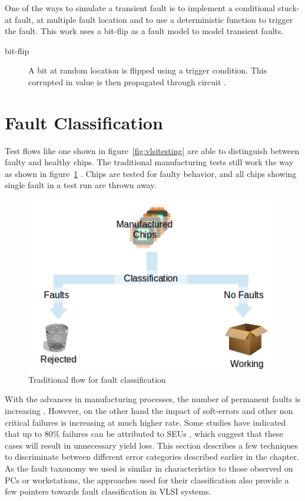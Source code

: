 One of the ways  to simulate a transient fault is to implement a conditional stuck-at fault, at multiple fault location and to use a deterministic function to trigger the fault. This work uses a bit-flip as a fault model to model transient faults.

\begin{description}
	\item[bit-flip] A bit at random location is flipped using a trigger condition. This corrupted in value is then propagated through circuit \cite{Gracia2001}. 
\end{description}

\section{Fault Classification}
\label{sec:secfc}
Test flows like one shown in figure~\ref{fig:vlsitesting} are able to distinguish between faulty and healthy chips. The traditional manufacturing tests still work the way as shown in figure~\ref{fig:traditionaltestflow} \cite{Weste1985}. Chips are tested for faulty behavior, and all chips showing single fault in a test run are thrown away.

\begin{figure}[h]
  \begin{center}
    \captionsetup{justification=centering}
    \includegraphics[scale=0.75]{figures/traditionaltestflow.png}
    \caption{Traditional flow for fault classification}
    \label{fig:traditionaltestflow}
  \end{center}
\end{figure}

With the advances in manufacturing processes, the number of permanent faults is increasing \cite{kishore2009}. However, on the other hand the impact of soft-errors and other non critical failures is increasing at much higher rate\cite{Constantinescu2003}. Some studies have indicated that up to 80\% failures can be attributed to SEUs \cite{Iyer1986, Dharchoudhury1994, kishore2009}, which suggest that these cases will result in unnecessary yield loss. This section describes a few techniques to discriminate between different error categories described earlier in the chapter. As the fault taxonomy we used is similar in characteristics to those observed on PCs or workstations, the approaches used for their classification also provide a few pointers towards fault classification in VLSI systems. 

